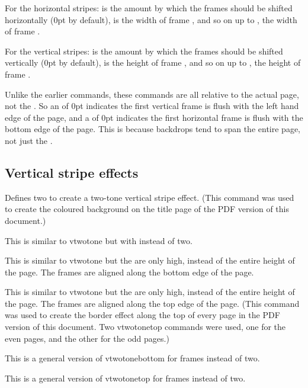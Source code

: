 \documentclass[fontsize=12pt]{scrbook}
\newcommand\thisdoc{the PDF version of this document}
\newcommand\thisdoc{this document}
\begin{document}
For the horizontal stripes:  is the amount by which
the frames should be shifted horizontally (0pt by default),
 is the width of frame , and so on up to
, the width of frame .

For the vertical stripes:  is the amount by which the
frames should be shifted vertically (0pt by default), 
 is the height of frame , and so on up to
, the height of frame .

\begin{important}
Unlike the earlier commands, these commands are all relative to the
actual page, not the .  So an  of 0pt
indicates the first vertical frame is flush with the left hand edge
of the page, and a  of 0pt indicates the first horizontal
frame is flush with the bottom edge of the page. This is because
backdrops tend to span the entire page, not just the
.
\end{important}

\subsection{Vertical stripe effects}\label{sec:vstripes}

Defines two  to create a two-tone vertical stripe
effect.  (This command was used to create the coloured background on
the title page of \thisdoc.)

This is similar to \gls{vtwotone} but with 
 instead of two.

This is similar to \gls{vtwotone} but the  are only
 high, instead of the entire height of the page.
The frames are aligned along the bottom edge of the page.

This is similar to \gls{vtwotone} but the  are only
 high, instead of the entire height of the page.
The frames are aligned along the top edge of the page.
(This command was used to create the border effect along
the top of every page in \thisdoc.  Two \gls{vtwotonetop}
commands were used, one for the even pages, and the other
for the odd pages.)

This is a general version of \gls{vtwotonebottom} for
 frames instead of two.

This is a general version of \gls{vtwotonetop} for
 frames instead of two.
\end{document}
